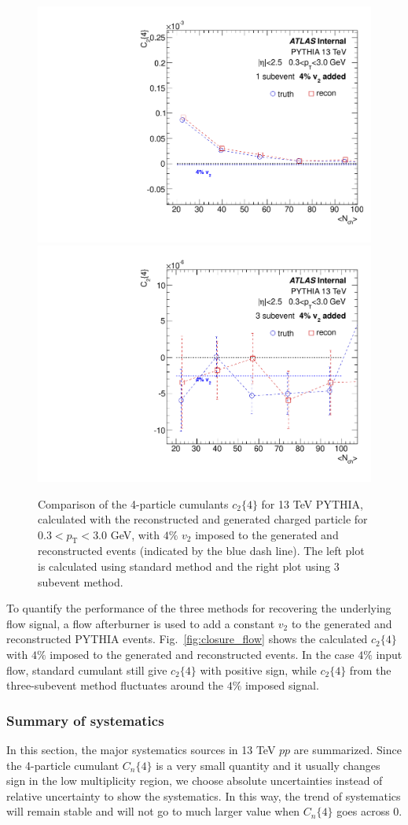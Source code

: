 \begin{figure}[H]
\centering
\includegraphics[width=0.45\linewidth]{figs/sec_sys/pp13/MC_closure_1sub_flow.pdf}
\includegraphics[width=0.45\linewidth]{figs/sec_sys/pp13/MC_closure_3sub_flow.pdf}
\caption{Comparison of the 4-particle cumulants $c_{2}\{4\}$ for 13 TeV PYTHIA, calculated with the reconstructed and generated charged particle for $0.3<p_{\text{T}}<3.0$ GeV, with $4\%$ $v_{2}$ imposed to the generated and reconstructed events (indicated by the blue dash line). The left plot is calculated using standard method and the right plot using 3 subevent method.}
\label{fig:MC_closure_flow}
\end{figure}
To quantify the performance of the three methods for recovering the underlying flow signal, a flow afterburner is used to add a constant $v_{2}$ to the generated and reconstructed PYTHIA events. Fig.~\ref{fig:closure_flow} shows the calculated $c_{2}\{4\}$ with $4\%$ imposed to the generated and reconstructed events. In the case $4\%$ input flow, standard cumulant still give $c_{2}\{4\}$ with positive sign, while $c_{2}\{4\}$ from the three-subevent method fluctuates around the $4\%$ imposed signal.


\subsubsection{Summary of systematics}
In this section, the major systematics sources in 13 TeV $pp$ are summarized. Since the 4-particle cumulant $C_{n}\{4\}$ is a very small quantity and it usually changes sign in the low multiplicity region, we choose absolute uncertainties instead of relative uncertainty to show the systematics. In this way, the trend of systematics will remain stable and will not go to much larger value when $C_{n}\{4\}$ goes across 0.

